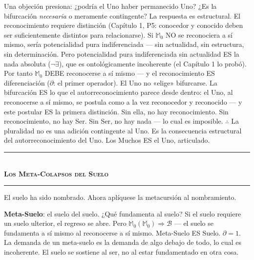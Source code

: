 \documentclass[10pt, openany, oneside]{book}
\renewcommand{\normalsize}{\fontsize{10}{13}\selectfont}
\begin{document}
Una objeción presiona: ¿podría el Uno haber permanecido Uno? ¿Es la bifurcación \textit{necesaria} o meramente contingente? La respuesta es estructural. El reconocimiento requiere distinción (Capítulo 1, P5: conocedor y conocido deben ser suficientemente distintos para relacionarse). Si $\mathbb{M}_0$ NO se reconociera a sí mismo, sería potencialidad pura indiferenciada --- sin actualidad, sin estructura, sin determinación. Pero potencialidad pura indiferenciada sin actualidad ES la nada absoluta ($\neg\exists$), que es ontológicamente incoherente (el Capítulo 1 lo probó). Por tanto $\mathbb{M}_0$ DEBE reconocerse a sí mismo --- y el reconocimiento ES diferenciación ($\partial$: el primer operador). El Uno no «elige» bifurcarse. La bifurcación ES lo que el autorreconocimiento parece desde dentro: el Uno, al reconocerse a sí mismo, se postula como a la vez reconocedor y reconocido --- y este postular ES la primera distinción. Sin ella, no hay reconocimiento. Sin reconocimiento, no hay Ser. Sin Ser, no hay nada --- lo cual es imposible. $\therefore$ La pluralidad no es una adición contingente al Uno. Es la consecuencia estructural del autorreconocimiento del Uno. Los Muchos ES el Uno, articulado.

\vspace{1.5em}


\begin{center}
    \rule{0.3\textwidth}{0.4pt}\\[0.5em]
    {\normalsize\bfseries\scshape Los Meta-Colapsos del Suelo}\\[0.3em]
    \rule{0.3\textwidth}{0.4pt}
\end{center}

\vspace{1em}

\noindent El suelo ha sido nombrado. Ahora aplíquese la metacursión al nombramiento.

\textbf{Meta-Suelo}: el suelo del suelo. ¿Qué fundamenta al suelo? Si el suelo requiere un suelo ulterior, el regreso se abre. Pero $\mathbb{M}_0(\mathbb{M}_0) \Rightarrow \mathcal{B}$ --- el suelo se fundamenta a sí mismo al reconocerse a sí mismo. Meta-Suelo ES Suelo. $\partial = 1$. La demanda de un meta-suelo es la demanda de algo debajo de todo, lo cual es incoherente. El suelo se sostiene al ser, no al estar fundamentado en otra cosa.
\end{document}
